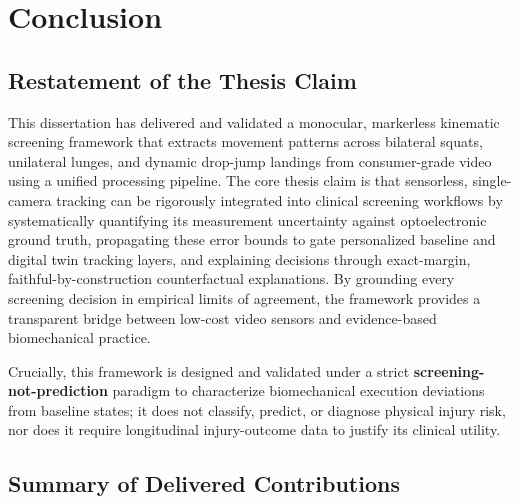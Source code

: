 \chapter{Conclusion}
\label{ch:conclusion}



\section{Restatement of the Thesis Claim}
\label{sec:15-1-restatement-of-the-thesis-claim}

This dissertation has delivered and validated a monocular, markerless kinematic screening framework that extracts movement patterns across bilateral squats, unilateral lunges, and dynamic drop-jump landings from consumer-grade video using a unified processing pipeline. The core thesis claim is that sensorless, single-camera tracking can be rigorously integrated into clinical screening workflows by systematically quantifying its measurement uncertainty against optoelectronic ground truth, propagating these error bounds to gate personalized baseline and digital twin tracking layers, and explaining decisions through exact-margin, faithful-by-construction counterfactual explanations. By grounding every screening decision in empirical limits of agreement, the framework provides a transparent bridge between low-cost video sensors and evidence-based biomechanical practice.

Crucially, this framework is designed and validated under a strict \textbf{screening-not-prediction} paradigm to characterize biomechanical execution deviations from baseline states; it does not classify, predict, or diagnose physical injury risk, nor does it require longitudinal injury-outcome data to justify its clinical utility.



\section{Summary of Delivered Contributions}
\label{sec:15-2-summary-of-delivered-contributions}


